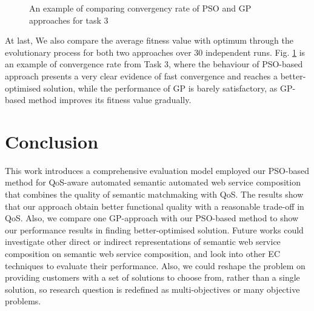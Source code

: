 \documentclass{IEEEtran}
\begin{document}
\begin{figure}[h]
\centering
{}
 \caption{An example of comparing convergency rate of PSO and GP approaches for task 3}
 \label{psovsgp}
\end{figure}

At last, We also compare the average fitness value with optimum through the evolutionary process for both two approaches over 30 independent runs. Fig. \ref{psovsgp} is an example of convergence rate from Task 3, where the behaviour of PSO-based approach presents a very clear evidence of fast convergence and reaches a better-optimised solution, while the performance of GP is barely satisfactory, as GP-based method improves its fitness value gradually.


\section{Conclusion}\label{conclusion}
This work introduces a comprehensive evaluation model employed our PSO-based method for QoS-aware automated semantic automated web service composition that combines the quality of semantic matchmaking with QoS. The results show that our approach obtain better functional quality with a reasonable trade-off in QoS. Also, we compare one GP-approach with our PSO-based method to show our performance results in finding better-optimised solution. Future works could investigate other direct or indirect representations of semantic web service composition on semantic web service composition, and look into other EC techniques to evaluate their performance. Also, we could reshape the problem on providing customers with a set of solutions to choose from, rather than a single solution, so research question is redefined as multi-objectives or many objective problems. 




\end{document}
